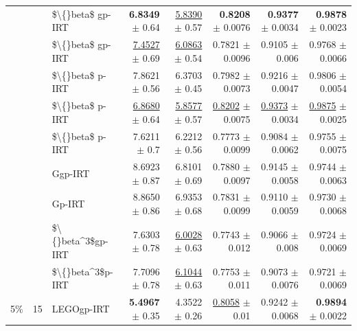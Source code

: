 \begin{longtable}{llp{}rrrrr}
 &  & \$\textbackslash\{\}beta\$ gp-IRT & \textbf{6.8349} {\scriptsize $\pm$ 0.64} & \underline{5.8390} {\scriptsize $\pm$ 0.57} & \textbf{0.8208} {\scriptsize $\pm$ 0.0076} & \textbf{0.9377} {\scriptsize $\pm$ 0.0034} & \textbf{0.9878} {\scriptsize $\pm$ 0.0023} \\
 &  & \$\textbackslash\{\}beta\$ gp-IRT & \underline{7.4527} {\scriptsize $\pm$ 0.69} & \underline{6.0863} {\scriptsize $\pm$ 0.54} & 0.7821 {\scriptsize $\pm$ 0.0096} & 0.9105 {\scriptsize $\pm$ 0.006} & 0.9768 {\scriptsize $\pm$ 0.0066} \\
 &  & \$\textbackslash\{\}beta\$ p-IRT & 7.8621 {\scriptsize $\pm$ 0.56} & 6.3703 {\scriptsize $\pm$ 0.45} & 0.7982 {\scriptsize $\pm$ 0.0073} & 0.9216 {\scriptsize $\pm$ 0.0047} & 0.9806 {\scriptsize $\pm$ 0.0054} \\
 &  & \$\textbackslash\{\}beta\$ p-IRT & \underline{6.8680} {\scriptsize $\pm$ 0.64} & \underline{5.8577} {\scriptsize $\pm$ 0.57} & \underline{0.8202} {\scriptsize $\pm$ 0.0075} & \underline{0.9373} {\scriptsize $\pm$ 0.0034} & \underline{0.9875} {\scriptsize $\pm$ 0.0025} \\
 &  & \$\textbackslash\{\}beta\$ p-IRT & 7.6211 {\scriptsize $\pm$ 0.7} & 6.2212 {\scriptsize $\pm$ 0.56} & 0.7773 {\scriptsize $\pm$ 0.0099} & 0.9084 {\scriptsize $\pm$ 0.0062} & 0.9755 {\scriptsize $\pm$ 0.0075} \\
 &  & Ggp-IRT & 8.6923 {\scriptsize $\pm$ 0.87} & 6.8101 {\scriptsize $\pm$ 0.69} & 0.7880 {\scriptsize $\pm$ 0.0097} & 0.9145 {\scriptsize $\pm$ 0.0058} & 0.9744 {\scriptsize $\pm$ 0.0063} \\
 &  & Gp-IRT & 8.8650 {\scriptsize $\pm$ 0.86} & 6.9353 {\scriptsize $\pm$ 0.68} & 0.7831 {\scriptsize $\pm$ 0.0099} & 0.9110 {\scriptsize $\pm$ 0.0059} & 0.9730 {\scriptsize $\pm$ 0.0068} \\
 &  & \$\textbackslash\{\}beta\textasciicircum{}3\$gp-IRT & 7.6303 {\scriptsize $\pm$ 0.78} & \underline{6.0028} {\scriptsize $\pm$ 0.63} & 0.7743 {\scriptsize $\pm$ 0.012} & 0.9066 {\scriptsize $\pm$ 0.008} & 0.9724 {\scriptsize $\pm$ 0.0069} \\
 &  & \$\textbackslash\{\}beta\textasciicircum{}3\$p-IRT & 7.7096 {\scriptsize $\pm$ 0.78} & \underline{6.1044} {\scriptsize $\pm$ 0.63} & 0.7753 {\scriptsize $\pm$ 0.011} & 0.9073 {\scriptsize $\pm$ 0.0076} & 0.9721 {\scriptsize $\pm$ 0.0069} \\
\midrule
5\% & 15 & LEGOgp-IRT & \textbf{5.4967} {\scriptsize $\pm$ 0.35} & 4.3522 {\scriptsize $\pm$ 0.26} & \underline{0.8058} {\scriptsize $\pm$ 0.01} & 0.9242 {\scriptsize $\pm$ 0.0068} & \textbf{0.9894} {\scriptsize $\pm$ 0.0022} \\

\end{longtable}
